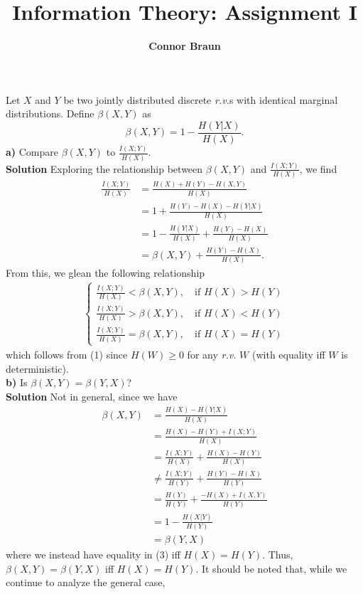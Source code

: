 \documentclass[11pt, letterpaper]{article}
\title{\bf Information Theory: Assignment I}
\author{\bf Connor Braun}
\date{}
\begin{document}
\maketitle
{} Let $X$ and $Y$ be two jointly distributed discrete {\it r.v.}s with identical marginal distributions.
Define $\beta(X,Y)$ as
\[\beta(X,Y)=1-\frac{H(Y|X)}{H(X)}.\]
{\bf a)} Compare $\beta(X,Y)$ to $\frac{I(X;Y)}{H(X)}$.\\[10pt]
{\bf Solution} Exploring the relationship between $\beta(X,Y)$ and $\frac{I(X;Y)}{H(X)}$, we find
\begin{align*}
    \frac{I(X;Y)}{H(X)}&=\frac{H(X)+H(Y)-H(X,Y)}{H(X)}\\
    &=1+\frac{H(Y)-H(X)-H(Y|X)}{H(X)}\tag{expanding $H(X,Y)=H(X)+H(Y|X)$}\\
    &=1-\frac{H(Y|X)}{H(X)}+\frac{H(Y)-H(X)}{H(X)}\\
    &=\beta(X,Y)+\frac{H(Y)-H(X)}{H(X)}.\tag{1}
\end{align*}
From this, we glean the following relationship
\begin{align*}
    \begin{cases}
        \frac{I(X;Y)}{H(X)}<\beta(X,Y),\quad\text{if $H(X)>H(Y)$}\\[5pt]
        \frac{I(X;Y)}{H(X)}>\beta(X,Y),\quad\text{if $H(X)<H(Y)$}\\[5pt]
        \frac{I(X;Y)}{H(X)}=\beta(X,Y),\quad\text{if $H(X)=H(Y)$}
    \end{cases}\tag{2}
\end{align*}
which follows from (1) since $H(W)\geq 0$ for any {\it r.v.} $W$ (with equality iff $W$ is deterministic).\\[10pt]
{\bf b)} Is $\beta(X,Y)=\beta(Y,X)$?\\[10pt]
{\bf Solution} Not in general, since we have
\begin{align*}
    \beta(X,Y)&=\frac{H(X)-H(Y|X)}{H(X)}\\
    &=\frac{H(X)-H(Y)+I(X;Y)}{H(X)}\tag{since $H(Y|X)=H(Y)-I(X;Y)$}\\
    &=\frac{I(X;Y)}{H(X)}+\frac{H(X)-H(Y)}{H(X)}\\
    &\neq\frac{I(X;Y)}{H(Y)}+\frac{H(Y)-H(X)}{H(Y)}\tag{3}\\
    &=\frac{H(Y)}{H(Y)}+\frac{-H(X)+I(X,Y)}{H(Y)}\\
    &=1-\frac{H(X|Y)}{H(Y)}\\
    &=\beta(Y,X)
\end{align*}
where we instead have equality in (3) iff $H(X)=H(Y)$. Thus, $\beta(X,Y)=\beta(Y,X)$ iff $H(X)=H(Y)$. It should be noted that, while we continue to analyze the general case,
\end{document}
